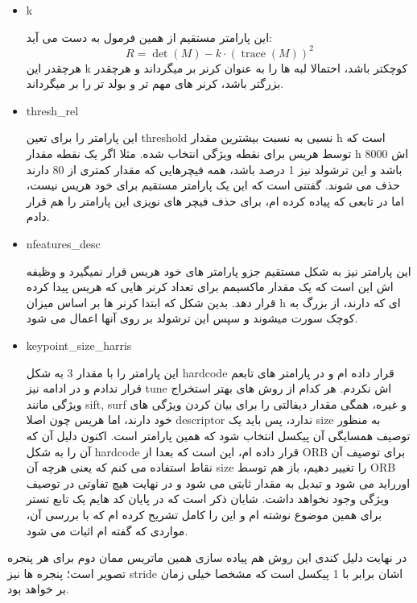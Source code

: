 \documentclass[a4paper,12pt]{article}
\begin{document}
\begin{enumerate}
\begin{itemize}
		\item k
		
		این پارامتر مستقیم از همین فرمول به دست می آید:
		\[
		R = \det(M) - k \cdot (\operatorname{trace}(M))^2
		\]
		هرچقدر این k کوچکتر باشد، احتمالا لبه ها را به عنوان کرنر بر میگرداند و هرچقدر بزرگتر باشد، کرنر های مهم تر و بولد تر را بر میگرداند.
		
		\item thresh\_rel
		
		این پارامتر را برای تعین threshold نسبی به نسبت بیشترین مقدار h است که توسط هریس برای نقطه ویژگی انتخاب شده. مثلا اگر یک نقطه مقدار h اش 8000 باشد و این ترشولد نیز 1 درصد باشد، همه فیچرهایی که مقدار کمتری از 80 دارند حذف می شوند. گفتنی است که این یک پارامتر مستقیم برای خود هریس نیست، اما در تابعی که پیاده کرده ام، برای حذف فیچر های نویزی این پارامتر را هم قرار دادم.
		
		\item nfeatures\_desc
		
		این پارامتر نیز به شکل مستقیم جزو پارامتر های خود هریس قرار نمیگیرد و وظیفه اش این است که یک مقدار ماکسیمم برای تعداد کرنر هایی که هریس پیدا کرده قرار دهد. بدین شکل که ابتدا کرنر ها بر اساس میزان h ای که دارند، از بزرگ به کوچک سورت میشوند و سپس این ترشولد بر روی آنها اعمال می شود.
		
		\item keypoint\_size\_harris
		
		این پارامتر را با مقدار 3 به شکل hardcode قرار داده ام و در پارامتر های تابعم قرار ندادم و در ادامه نیز tune اش نکردم. هر کدام از روش های بهتر استخراج ویژگی مانند sift, surf و غیره، همگی مقدار دیفالتی را برای بیان کردن ویژگی های خود دارند، اما هریس چون اصلا descriptor ندارد، پس باید یک size به منظور توصیف همسایگی آن پیکسل انتخاب شود که همین پارامتر است. اکنون دلیل آن که آن را به شکل hardcode قرار داده ام، این است که بعدا از ORB برای توصیف آن نقاط استفاده می کنم که یعنی هرچه آن size را تغییر دهیم، باز هم توسط ORB اورراید می شود و تبدیل به مقدار ثابتی می شود و در نهایت هیچ تفاوتی در توصیف ویژگی وجود نخواهد داشت. شایان ذکر است که در پایان کد هایم یک تابع تستر برای همین موضوع نوشته ام و این را کامل تشریح کرده ام که با بررسی آن، مواردی که گفته ام اثبات می شود.
		
	\end{itemize}
	در نهایت دلیل کندی این روش هم پیاده سازی همین ماتریس ممان دوم برای هر پنجره تصویر است؛ پنجره ها نیز stride اشان برابر با 1 پیکسل است که مشخصا خیلی زمان بر خواهد بود.
\end{enumerate}
\end{document}
